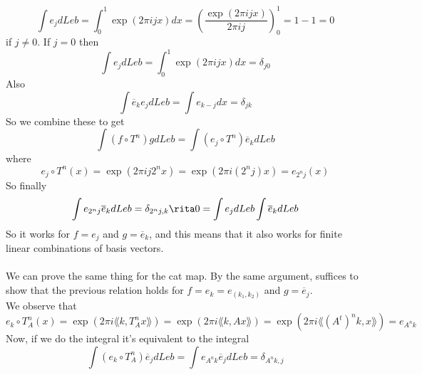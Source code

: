 $$
	\int e_j d Leb = \int_0^1 \exp(2\pi i j x) dx = \left(\frac{\exp(2\pi i j x)}{2\pi i j}\right)_0^1 = 1-1 = 0
$$
if $j \neq 0$. If $j=0$ then 
$$
	\int e_j d Leb = \int_0^1 \exp(2\pi i j x) dx = \delta_{j0}
$$
Also
$$
	\int \overline{e}_ke_j d Leb = \int e_{k-j} dx = \delta_{jk}
$$
So we combine these to get
$$
	\int (f\circ T^n)g d Leb = \int (e_j \circ T^n)\overline{e}_k d Leb
$$
where 
$$
	e_j \circ T^n(x) = \exp(2\pi i j 2^n x) = \exp(2\pi i (2^n j) x) = e_{2^n j}(x)
$$
So finally
$$
	\int e_{2^n j}\overline{e}_k d Leb = \delta_{2^nj,k} \rita 0 = \int e_j d Leb \int \overline{e}_k d Leb
$$
So it works for $f = e_j$ and $g = \overline{e}_k$, and this means that it also works for finite linear combinations of basis vectors. \\ \\
We can prove the same thing for the cat map. By the same argument, suffices to show that the previous relation holds for $f = e_k = e_{(k_1,k_2)}$ and $g = \overline{e}_j$. \\
We observe that 
$$
	e_k \circ T_A^n(x) = \exp(2\pi i \lang k, T_A^n x \rang) = \exp(2\pi i \lang k, A x \rang) = \exp(2\pi i \lang (A^t)^n k, x \rang) = e_{A^nk}
$$ 
Now, if we do the integral it's equivalent to the integral
$$
	\int (e_k \circ T_A^n)\overline{e}_jd Leb = \int e_{A^n k} \overline{e}_j d Leb = \delta_{A^nk,j}
$$














